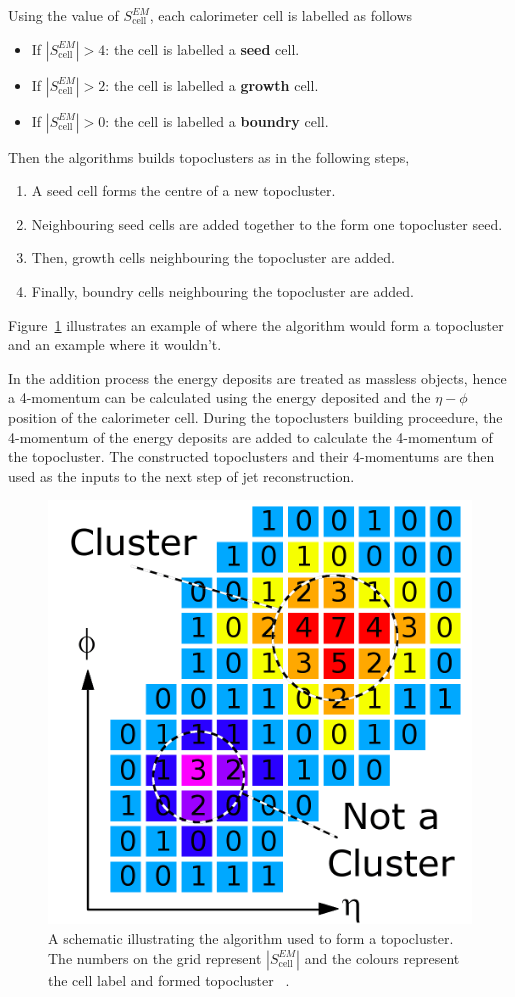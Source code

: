 \noindent
Using the value of $S_{\text{cell}}^{EM}$, each calorimeter cell is labelled as follows
\begin{itemize}
\item If $|S_{\text{cell}}^{EM}| > 4$: the cell is labelled a \textbf{seed} cell.
\item If $|S_{\text{cell}}^{EM}| > 2$: the cell is labelled a \textbf{growth} cell.
\item If $|S_{\text{cell}}^{EM}| > 0$: the cell is labelled a \textbf{boundry} cell.
\end{itemize}
Then the algorithms builds topoclusters as in the following steps,
\begin{enumerate}
\item A seed cell forms the centre of a new topocluster.
\item Neighbouring seed cells are added together to the form one topocluster seed.
\item Then, growth cells neighbouring the topocluster are added.
\item Finally, boundry cells neighbouring the topocluster are added.
\end{enumerate}
Figure~\ref{fig:obj-topo_schem} illustrates an example of where the algorithm would form a topocluster and an example where it wouldn't.

In the addition process the energy deposits are treated as massless objects,
hence a 4-momentum can be calculated using the energy deposited and the $\eta-\phi$ position of the calorimeter cell.
During the topoclusters building proceedure, the 4-momentum of the energy deposits are added to calculate the 4-momentum of the topocluster.
The constructed topoclusters and their 4-momentums are then used as the inputs to the next step of jet reconstruction.

\begin{figure}[!hbt]
  \begin{center}
    \includegraphics[width=0.45\linewidth, angle=0]{figs/Objects/topo_schem.png}
  \end{center}
  \caption[A schematic illustrating the algorithm used to form a topocluster. The numbers on the grid represent $|S_{\text{cell}}^{EM}|$ and the colours represent the cell label and formed topocluster.]
          {A schematic illustrating the algorithm used to form a topocluster. The numbers on the grid represent $|S_{\text{cell}}^{EM}|$ and the colours represent the cell label and formed topocluster
            ~\cite{det-magnet_fig}.}
  \label{fig:obj-topo_schem}
\end{figure}


